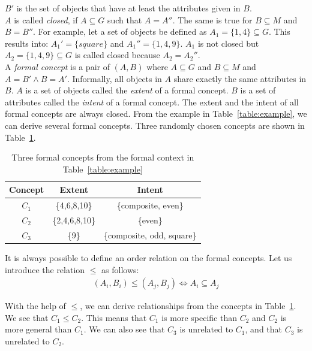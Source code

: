 \documentclass[11pt]{report}
\begin{document}
$B'$ is the set of objects that have at least the attributes given in $B$. \\

$A$ is called \textit{closed}, if $A \subseteq G$ such that $A = A''$. The same is true for $B \subseteq M$ and $B = B''$. For example, let a set of objects be defined as $A_1 = \{1,4\} \subseteq G$. This results into: $A_1' = \{square\}$ and $A_1'' = \{1,4,9\}$. $A_1$ is not closed but $A_2 = \{1,4,9\} \subseteq G$ is called closed because $A_2 = A_2''$. \\   

A \textit{formal concept} is a pair of $(A, B)$ where $A \subseteq G$ and $B \subseteq M$ and $A = B' \wedge B = A' $. Informally, all objects in $A$ share exactly the same attributes in $B$. $A$ is a set of objects called the \textit{extent} of a formal concept. $B$ is a set of attributes called the \textit{intent} of a formal concept. The extent and the intent of all formal concepts are always closed. From the example in Table~\ref{table:example}, we can derive several formal concepts. Three randomly chosen concepts are shown in Table~\ref{table:exampleConcepts}. \\

\begin{table}[h]
\caption{Three formal concepts from the formal context in Table~\ref{table:example}}
\label{table:exampleConcepts}
\centering

\def\arraystretch{1.2}%
\begin{tabular}{ c c c }
\hline
 Concept & Extent & Intent \\
\hline

$C_1$ & \{4,6,8,10\} & \{composite, even\} \\
$C_2$ & \{2,4,6,8,10\} & \{even\} \\
$C_3$ & \{9\} & \{composite, odd, square\} \\

\hline
\end{tabular}
\end{table}

It is always possible to define an order relation on the formal concepts. Let us introduce the relation $\le$ as follows:
\begin{align*} (A_i,B_i) \le (A_j, B_j) \Longleftrightarrow	A_i \subseteq A_j
\end{align*}

With the help of $\le$, we  can derive relationships from the concepts in Table~\ref{table:exampleConcepts}. We see that $C_1 \le C_2$. This means that $C_1$ is more specific than $C_2$ and $C_2$ is more general than $C_1$. We can also see that $C_3$ is unrelated to $C_1$, and that $C_3$ is unrelated to $C_2$. \\
\end{document}
